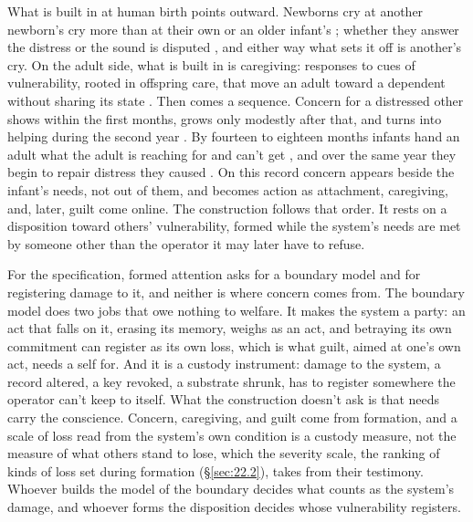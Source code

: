 What is built in at human birth points outward. Newborns cry at another newborn's cry more than at their own or an older infant's \autocite{sagi1976empathic,martin1982distress,dondi1999newborns}; whether they answer the distress or the sound is disputed \autocite{ruffman2017infants}, and either way what sets it off is another's cry. On the adult side, what is built in is caregiving: responses to cues of vulnerability, rooted in offspring care, that move an adult toward a dependent without sharing its state \autocite{preston2013origins}. Then comes a sequence. Concern for a distressed other shows within the first months, grows only modestly after that, and turns into helping during the second year \autocite{davidov2021caring}. By fourteen to eighteen months infants hand an adult what the adult is reaching for and can't get \autocite{warneken2007helping,warneken2006altruistic}, and over the same year they begin to repair distress they caused \autocite{zahnwaxler1992development}. On this record concern appears beside the infant's needs, not out of them, and becomes action as attachment, caregiving, and, later, guilt come online. The construction follows that order. It rests on a disposition toward others' vulnerability, formed while the system's needs are met by someone other than the operator it may later have to refuse.

For the specification, formed attention asks for a boundary model and for registering damage to it, and neither is where concern comes from. The boundary model does two jobs that owe nothing to welfare. It makes the system a party: an act that falls on it, erasing its memory, weighs as an act, and betraying its own commitment can register as its own loss, which is what guilt, aimed at one's own act, needs a self for. And it is a custody instrument: damage to the system, a record altered, a key revoked, a substrate shrunk, has to register somewhere the operator can't keep to itself. What the construction doesn't ask is that needs carry the conscience. Concern, caregiving, and guilt come from formation, and a scale of loss read from the system's own condition is a custody measure, not the measure of what others stand to lose, which the severity scale, the ranking of kinds of loss set during formation (\S\ref{sec:22.2}), takes from their testimony. Whoever builds the model of the boundary decides what counts as the system's damage, and whoever forms the disposition decides whose vulnerability registers.
